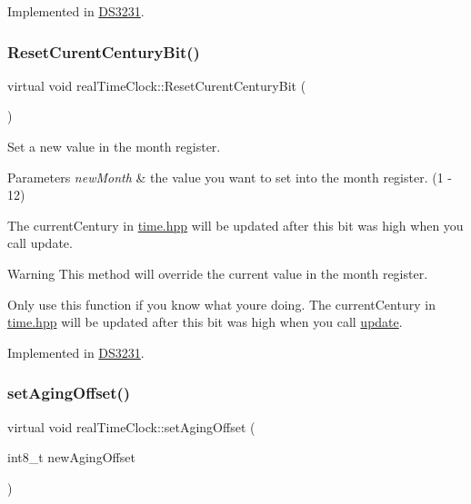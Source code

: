 Implemented in \mbox{\hyperlink{class_d_s3231_aee77c6ecb3c292d375eebe7e58ebb024}{D\+S3231}}.

\mbox{\label{classreal_time_clock_a50e19a6b0aef44719e91e3e753da0dce}} 
\subsubsection{\texorpdfstring{Reset\+Curent\+Century\+Bit()}{ResetCurentCenturyBit()}}
{\footnotesize\ttfamily virtual void real\+Time\+Clock\+::\+Reset\+Curent\+Century\+Bit (\begin{DoxyParamCaption}{ }\end{DoxyParamCaption})\hspace{0.3cm}{\ttfamily [pure virtual]}}



Set a new value in the month register. 


\begin{DoxyParams}{Parameters}
{\em new\+Month} & the value you want to set into the month register. (1 -\/ 12)\\
\hline
\end{DoxyParams}
The current\+Century in \mbox{\hyperlink{time_8hpp_source}{time.\+hpp}} will be updated after this bit was high when you call update. \begin{DoxyWarning}{Warning}
This method will override the current value in the month register. 

Only use this function if you know what you\textquotesingle{}re doing. The current\+Century in \mbox{\hyperlink{time_8hpp_source}{time.\+hpp}} will be updated after this bit was high when you call \mbox{\hyperlink{classreal_time_clock_afb5132ca3cbe80552a88041cead0a2b3}{update}}. 
\end{DoxyWarning}


Implemented in \mbox{\hyperlink{class_d_s3231_a6477bd1bb91d3df6a088c369692f46a3}{D\+S3231}}.

\mbox{\label{classreal_time_clock_aacf97da86677ee3fb55b5180ba5c0727}} 
\subsubsection{\texorpdfstring{set\+Aging\+Offset()}{setAgingOffset()}}
{\footnotesize\ttfamily virtual void real\+Time\+Clock\+::set\+Aging\+Offset (\begin{DoxyParamCaption}\item[{int8\+\_\+t}]{new\+Aging\+Offset }\end{DoxyParamCaption})\hspace{0.3cm}{\ttfamily [pure virtual]}}



